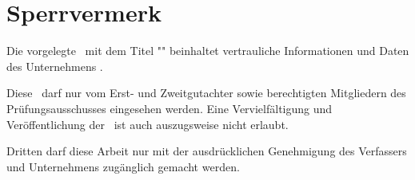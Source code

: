 \section*{Sperrvermerk}
Die vorgelegte \myworktype ~mit dem Titel "\textit{{\mytitle}}" beinhaltet vertrauliche Informationen und Daten des Unternehmens \mydualpartner.

Diese \myworktype ~darf nur vom Erst- und Zweitgutachter sowie berechtigten Mitgliedern des Prüfungsausschusses eingesehen werden. Eine Vervielfältigung und Veröffentlichung der \myworktype ~ist auch auszugsweise nicht erlaubt.

Dritten darf diese Arbeit nur mit der ausdrücklichen Genehmigung des Verfassers und Unternehmens zugänglich gemacht werden.

\newpage